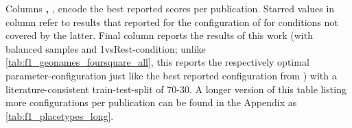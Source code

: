 \begin{table}[H]
{	Columns \textbf{\cite{Derrac2015}, \cite{Ager2018}}, \textbf{\cite{Alshaikh2020}} encode the best reported scores per publication. Starred values in column \textbf{\cite{Derrac2015}} refer to results that \cite{Ager2018} reported for the configuration of \cite{Derrac2015} for conditions not covered by the latter. Final column reports the results of this work (with balanced samples and 1vsRest-condition; unlike \autoref{tab:f1_geonames_foursquare_all}, this reports the respectively optimal parameter-configuration just like the best reported configuration from \mainalgos) with a literature-consistent train-test-split of 70-30. A longer version of this table listing more configurations per publication can be found in the Appendix as \autoref{tab:f1_placetypes_long}.}
	\label{tab:f1_mainalgos_me_short}
\end{table}


